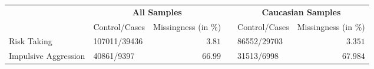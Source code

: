 \begin{tabular}{llrclr}
\hline\hline
\multicolumn{1}{l}{\bfseries }&\multicolumn{2}{c}{\bfseries All Samples}&\multicolumn{1}{c}{\bfseries }&\multicolumn{2}{c}{\bfseries Caucasian Samples}\tabularnewline
\cline{2-3} \cline{5-6}
\multicolumn{1}{l}{}&\multicolumn{1}{c}{Control/Cases}&\multicolumn{1}{c}{Missingness (in \%)}&\multicolumn{1}{c}{}&\multicolumn{1}{c}{Control/Cases}&\multicolumn{1}{c}{Missingness (in \%)}\tabularnewline
\hline
Risk Taking&107011/39436&$ 3.81$&&86552/29703&$ 3.351$\tabularnewline
Impulsive Aggression&40861/9397&$66.99$&&31513/6998&$67.984$\tabularnewline
\hline
\end{tabular}
